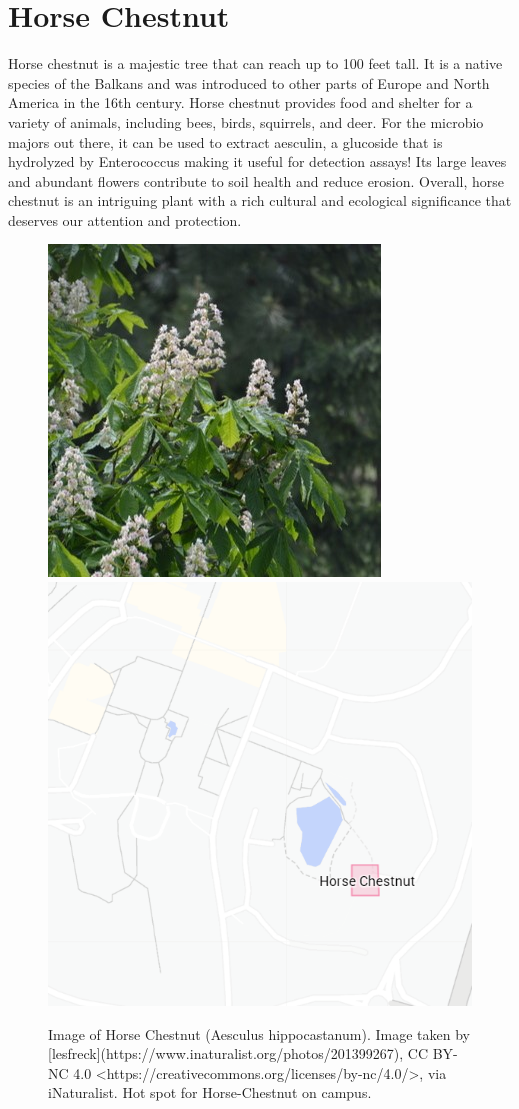 \documentclass[
]{book}
\begin{document}
\hypertarget{horse-chestnut}{%
\section{Horse Chestnut}\label{horse-chestnut}}

Horse chestnut is a majestic tree that can reach up to 100 feet tall. It is a native species of the Balkans and was introduced to other parts of Europe and North America in the 16th century. Horse chestnut provides food and shelter for a variety of animals, including bees, birds, squirrels, and deer. For the microbio majors out there, it can be used to extract aesculin, a glucoside that is hydrolyzed by Enterococcus making it useful for detection assays! Its large leaves and abundant flowers contribute to soil health and reduce erosion. Overall, horse chestnut is an intriguing plant with a rich cultural and ecological significance that deserves our attention and protection.

\begin{figure}

{\centering \includegraphics[width=0.49\linewidth,height=0.2\textheight]{plant_images/horse_c_11} \includegraphics[width=0.49\linewidth,height=0.2\textheight]{plant_images/horse_c_hotspot_11} 

}

\caption{Image of Horse Chestnut (Aesculus hippocastanum). Image taken by [lesfreck](https://www.inaturalist.org/photos/201399267), CC BY-NC 4.0 <https://creativecommons.org/licenses/by-nc/4.0/>, via iNaturalist. Hot spot for Horse-Chestnut on campus.}\label{fig:unnamed-chunk-6}
\end{figure}
\end{document}
